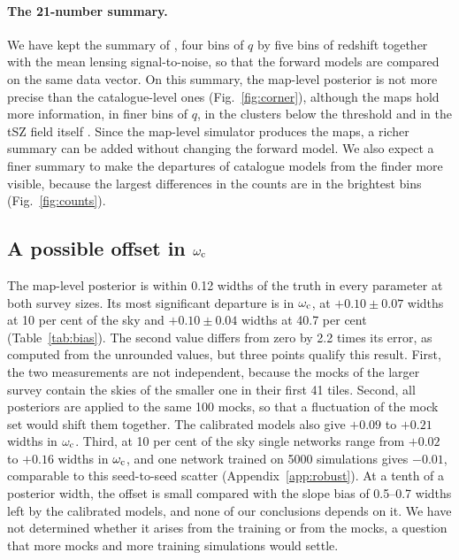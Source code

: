 \paragraph*{The 21-number summary.} We have kept the summary of \citet{Zubeldia2025}, four bins of $q$ by
five bins of redshift together with the mean lensing signal-to-noise, so that the forward models are
compared on the same data vector. On this summary, the map-level posterior is not more precise than the
catalogue-level ones (Fig.~\ref{fig:corner}), although the maps hold more information, in finer bins of
$q$, in the clusters below the threshold and in the tSZ field itself
\citep{Hill2014,Bolliet2018,EmbilVillagra2026}. Since the map-level simulator produces the maps, a richer
summary can be added without changing the forward model. We also expect a finer summary to make the
departures of catalogue models from the finder more visible, because the largest differences in the
counts are in the brightest bins (Fig.~\ref{fig:counts}).

\subsection{A possible offset in \texorpdfstring{$\omega_\mathrm{c}$}{omega\_c}}\label{sec:discussion:omegac}

The map-level posterior is within 0.12 widths of the truth in every parameter at both survey sizes. Its most significant departure is in $\omega_\mathrm{c}$, at $+0.10\pm0.07$ widths at 10 per cent of the sky and
$+0.10\pm0.04$ widths at 40.7 per cent (Table~\ref{tab:bias}). The second value differs from zero by 2.2
times its error, as computed from the unrounded values, but three points qualify this result. First, the two
measurements are not independent, because the mocks of the larger survey contain the skies of the smaller
one in their first 41 tiles. Second, all posteriors are applied to the same 100 mocks, so that a
fluctuation of the mock set would shift them together. The calibrated models also give $+0.09$ to
$+0.21$ widths in $\omega_\mathrm{c}$. Third, at 10 per cent of the sky single networks range from $+0.02$ to $+0.16$
widths in $\omega_\mathrm{c}$, and one network trained on 5000 simulations gives $-0.01$, comparable to this
seed-to-seed scatter (Appendix~\ref{app:robust}). At a tenth of a posterior width, the offset is small
compared with the slope bias of 0.5--0.7 widths left by the calibrated models, and none of our conclusions
depends on it. We have not determined whether it arises from the training or from the mocks, a question
that more mocks and more training simulations would settle.

